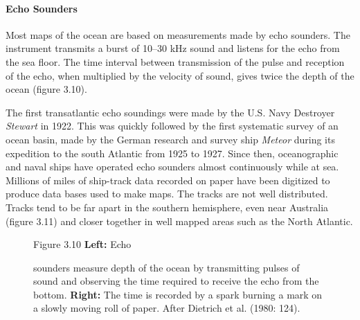 \paragraph{Echo Sounders} Most maps of the ocean are based
on measurements made by echo sounders. The instrument transmits a
burst of 10--30 kHz sound and
listens for the echo from the sea floor. The time interval between
transmission of the pulse and reception of the echo, when multiplied
by the velocity of sound, gives twice the depth of the ocean (figure
3.10).

The first transatlantic echo soundings were made by the U.S. Navy
Destroyer \textit{Stewart} in 1922. This was quickly followed by the
first systematic survey of an ocean basin, made by the German research
and survey ship \textit{Meteor} during its expedition to the south
Atlantic from 1925 to 1927. Since then, oceanographic and naval ships
have operated echo sounders almost continuously while at sea. Millions
of miles of ship-track data recorded on paper have been digitized to
produce data bases used to make maps.  The tracks are not well
distributed. Tracks tend to be far apart in the southern hemisphere,
even near Australia (figure 3.11) and closer together in well mapped
areas such as the North Atlantic.

\begin{figure}[t!]
\footnotesize
Figure 3.10 \textbf{Left:} Echo \rule{0ex}{5ex}sounders measure depth
of the ocean by transmitting pulses of sound and observing the time required to receive the echo
from the bottom. \textbf{Right:} The time is recorded by a spark
burning a mark on a slowly moving roll of paper. After Dietrich et
al. (1980: 124).
\label{fig:Sonar}
\vspace{-3ex}
\end{figure}

